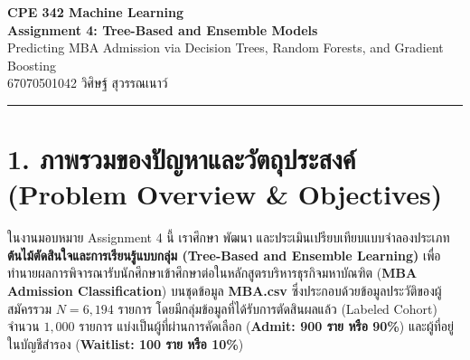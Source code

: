 \documentclass[12pt,a4paper]{article}
\newcommand{\codevar}[1]{\textcolor{codeaccent}{\textbf{#1}}}
\begin{document}
\begin{center}
    {\Large\textbf{CPE 342 Machine Learning}}\\[2pt]
    {\Large\textbf{Assignment 4: Tree-Based and Ensemble Models}}\\[4pt]
    {\large Predicting MBA Admission via Decision Trees, Random Forests, and Gradient Boosting}\\[6pt]
    \textcolor{accentblue}{67070501042 วิศิษฐ์ สุวรรณเนาว์}
\end{center}

\noindent\rule{\textwidth}{0.4pt}\vspace{4pt}

\section*{1. ภาพรวมของปัญหาและวัตถุประสงค์\\ \large(Problem Overview \& Objectives)}

ในงานมอบหมาย Assignment 4 นี้ เราศึกษา พัฒนา และประเมินเปรียบเทียบแบบจำลองประเภท \textbf{ต้นไม้ตัดสินใจและการเรียนรู้แบบกลุ่ม (Tree-Based and Ensemble Learning)} เพื่อทำนายผลการพิจารณารับนักศึกษาเข้าศึกษาต่อในหลักสูตรบริหารธุรกิจมหาบัณฑิต (\textbf{MBA Admission Classification}) บนชุดข้อมูล \codevar{MBA.csv} ซึ่งประกอบด้วยข้อมูลประวัติของผู้สมัครรวม $N = 6,194$ รายการ โดยมีกลุ่มข้อมูลที่ได้รับการตัดสินผลแล้ว (Labeled Cohort) จำนวน $1,000$ รายการ แบ่งเป็นผู้ที่ผ่านการคัดเลือก (\textbf{Admit: 900 ราย หรือ 90\%}) และผู้ที่อยู่ในบัญชีสำรอง (\textbf{Waitlist: 100 ราย หรือ 10\%})
\end{document}
